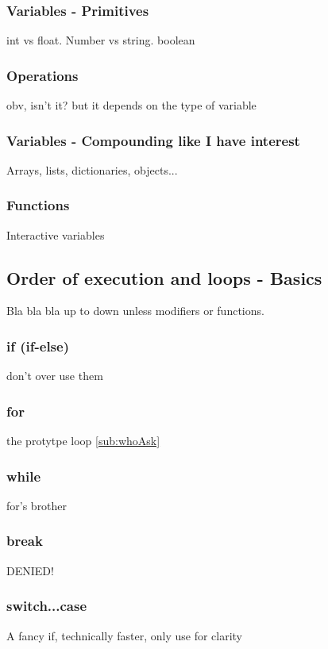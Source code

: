     \subsubsection{Variables - Primitives}
    \label{subsub:primitives}
int vs float. Number vs string. boolean
    \subsubsection{Operations}
    \label{subsub:operations}
obv, isn't it? but it depends on the type of variable
    \subsubsection{Variables - Compounding like I have interest} 
    \label{subsub:array}
Arrays, lists, dictionaries, objects...
    \subsubsection{Functions}
    \label{subsub:functions}
Interactive variables

\subsection{Order of execution and loops - Basics}
\label{sub:execBasic}
Bla bla bla up to down unless modifiers or functions.
    \subsubsection{if (if-else)}
    \label{subsub:if}
don't over use them

    \subsubsection{for}
    \label{subsub:for}
the protytpe loop \ref{sub:whoAsk}

    \subsubsection{while}
    \label{sub:while}
for's brother

    \subsubsection{break}
    \label{subsub:break}
DENIED!

    \subsubsection{switch...case}
    \label{subsub:switch}
A fancy if, technically faster, only use for clarity

